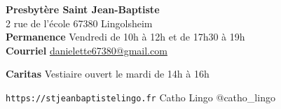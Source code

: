 \begin{framed}
\textbf{Presbytère Saint Jean-Baptiste} \\
2 rue de l'école 67380 Lingolsheim  \\
\textbf{Permanence} Vendredi de 10h à 12h et de 17h30 à 19h\\
\textbf{Courriel} \href{mailto:danielette67380@gmail.com}{danielette67380@gmail.com}

\textbf{Caritas} Vestiaire ouvert le mardi de 14h à 16h

\texttt{https://stjeanbaptistelingo.fr} \hfill \faFacebook Catho Lingo \hfill \faInstagram @catho\_lingo
\end{framed}

